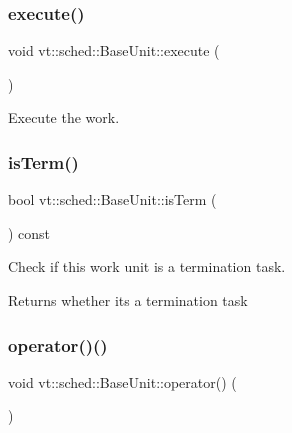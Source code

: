 \subsubsection{\texorpdfstring{execute()}{execute()}}
{\footnotesize\ttfamily void vt\+::sched\+::\+Base\+Unit\+::execute (\begin{DoxyParamCaption}{ }\end{DoxyParamCaption})}



Execute the work. 

\mbox{\label{structvt_1_1sched_1_1_base_unit_a18e4bf669d499be8e9443011bf9c6b02}} 
\subsubsection{\texorpdfstring{is\+Term()}{isTerm()}}
{\footnotesize\ttfamily bool vt\+::sched\+::\+Base\+Unit\+::is\+Term (\begin{DoxyParamCaption}{ }\end{DoxyParamCaption}) const\hspace{0.3cm}{\ttfamily [inline]}}



Check if this work unit is a termination task. 

\begin{DoxyReturn}{Returns}
whether it\textquotesingle{}s a termination task 
\end{DoxyReturn}
\mbox{\label{structvt_1_1sched_1_1_base_unit_accbb274436789b6b8ed99c3ee42a8114}} 
\subsubsection{\texorpdfstring{operator()()}{operator()()}}
{\footnotesize\ttfamily void vt\+::sched\+::\+Base\+Unit\+::operator() (\begin{DoxyParamCaption}{ }\end{DoxyParamCaption})\hspace{0.3cm}{\ttfamily [inline]}}



